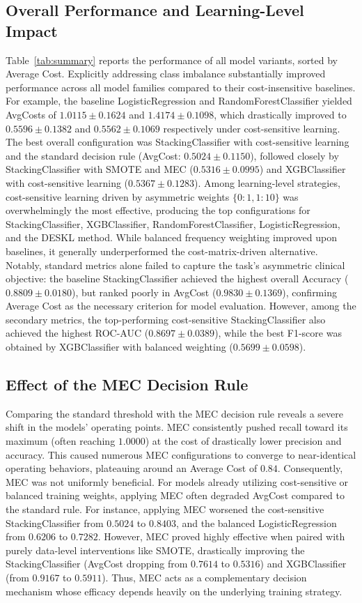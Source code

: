 \documentclass[conference]{IEEEtran}
\begin{document}
\subsection{Overall Performance and Learning-Level Impact}
Table~\ref{tab:summary} reports the performance of all model variants, sorted by Average Cost. Explicitly addressing class imbalance substantially improved performance across all model families compared to their cost-insensitive baselines. For example, the baseline LogisticRegression and RandomForestClassifier yielded AvgCosts of $1.0115 \pm 0.1624$ and $1.4174 \pm 0.1098$, which drastically improved to $0.5596 \pm 0.1382$ and $0.5562 \pm 0.1069$ respectively under cost-sensitive learning. The best overall configuration was StackingClassifier with cost-sensitive learning and the standard decision rule (AvgCost: $0.5024 \pm 0.1150$), followed closely by StackingClassifier with SMOTE and MEC ($0.5316 \pm 0.0995$) and XGBClassifier with cost-sensitive learning ($0.5367 \pm 0.1283$). Among learning-level strategies, cost-sensitive learning driven by asymmetric weights $\{0:1, 1:10\}$ was overwhelmingly the most effective, producing the top configurations for StackingClassifier, XGBClassifier, RandomForestClassifier, LogisticRegression, and the DESKL method. While balanced frequency weighting improved upon baselines, it generally underperformed the cost-matrix-driven alternative. Notably, standard metrics alone failed to capture the task's asymmetric clinical objective: the baseline StackingClassifier achieved the highest overall Accuracy ($0.8809 \pm 0.0180$), but ranked poorly in AvgCost ($0.9830 \pm 0.1369$), confirming Average Cost as the necessary criterion for model evaluation. However, among the secondary metrics, the top-performing cost-sensitive StackingClassifier also achieved the highest ROC-AUC ($0.8697 \pm 0.0389$), while the best F1-score was obtained by XGBClassifier with balanced weighting ($0.5699 \pm 0.0598$).

\subsection{Effect of the MEC Decision Rule}
Comparing the standard threshold with the MEC decision rule reveals a severe shift in the models' operating points. MEC consistently pushed recall toward its maximum (often reaching $1.0000$) at the cost of drastically lower precision and accuracy. This caused numerous MEC configurations to converge to near-identical operating behaviors, plateauing around an Average Cost of $0.84$. Consequently, MEC was not uniformly beneficial. For models already utilizing cost-sensitive or balanced training weights, applying MEC often degraded AvgCost compared to the standard rule. For instance, applying MEC worsened the cost-sensitive StackingClassifier from $0.5024$ to $0.8403$, and the balanced LogisticRegression from $0.6206$ to $0.7282$. However, MEC proved highly effective when paired with purely data-level interventions like SMOTE, drastically improving the StackingClassifier (AvgCost dropping from $0.7614$ to $0.5316$) and XGBClassifier (from $0.9167$ to $0.5911$). Thus, MEC acts as a complementary decision mechanism whose efficacy depends heavily on the underlying training strategy.
\end{document}
